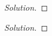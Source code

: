 \documentclass[12pt]{article}
\newenvironment{problem}[2][Problem]{\begin{trivlist}
\item[\hskip \labelsep {\bfseries #1}\hskip \labelsep {\bfseries #2.}]}{\end{trivlist}}
\newenvironment{solution}{\renewcommand\qedsymbol{$\blacksquare$}\begin{proof}[Solution]}{\end{proof}}
\begin{document}
\begin{solution}

\end{solution}


\begin{problem}{10}

\end{problem}

\begin{solution}

\end{solution}


\begin{problem}{11}

\end{problem}
\end{document}
